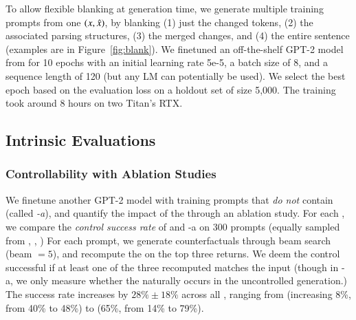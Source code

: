 To allow flexible blanking at generation time, we generate multiple training prompts from one $(x, \hat{x})$, by blanking (1) just the changed tokens, (2) the associated parsing structures, (3) the merged changes, and (4) the entire sentence (examples are in Figure~\ref{fig:blank}).
We finetuned an off-the-shelf GPT-2 model from \citet{Wolf2019HuggingFacesTS} for 10 epochs with an initial learning rate 5e-5, a batch size of 8, and a sequence length of 120 (but any LM can potentially be used).
We select the best epoch based on the evaluation loss on a holdout set of size 5,000.
The training took around 8 hours on two Titan's RTX.


\subsection{Intrinsic Evaluations}
\label{appendix:intrinsic}

\subsubsection{Controllability with Ablation Studies}
\label{appendix:ablation_control}



We finetune another GPT-2 model with training prompts that \emph{do not} contain \tagstrs (called \emph{\sysname-a}), and quantify the impact of the \tagstrshorts through an ablation study.
For each \tagstr, we compare the \emph{control success rate} of \sysname and \sysname-a on 300 prompts (equally sampled from \qqp, \dnli, \dsst)
For each prompt, we generate counterfactuals through beam search (beam $=5$), and recompute the \tagstrshorts on the top three returns.
We deem the control successful if at least one of the three recomputed \tagstrshorts matches the input (though in \sysname-a, we only measure whether the \tagstrshort naturally occurs in the uncontrolled generation.)
The success rate increases by $28\% \pm 18\%$ across all \tagstrs, ranging from  (increasing 8\%, from 40\% to 48\%) to  (65\%, from 14\% to 79\%).


